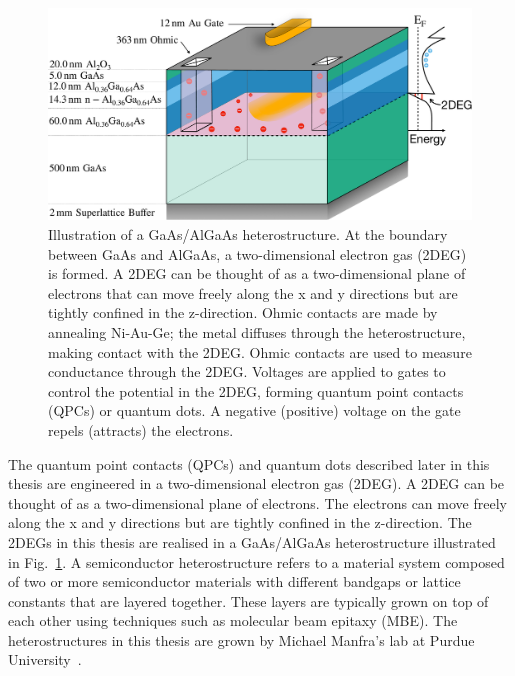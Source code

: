 \begin{figure}[!htb]
 \begin{center}
 \includegraphics[width=1.0\textwidth]{figures/ch1/figure2.pdf}
 \caption[GaAs/AlGaAs Heterostructure]{\label{fig:ch1/2Deg} 
 Illustration of a GaAs/AlGaAs heterostructure. At the boundary between GaAs and AlGaAs, a two-dimensional electron gas (2DEG) is formed. A 2DEG can be thought of as a two-dimensional plane of electrons that can move freely along the x and y directions but are tightly confined in the z-direction. Ohmic contacts are made by annealing Ni-Au-Ge; the metal diffuses through the heterostructure, making contact with the 2DEG. Ohmic contacts are used to measure conductance through the 2DEG. Voltages are applied to gates to control the potential in the 2DEG, forming quantum point contacts (QPCs) or quantum dots. A negative (positive) voltage on the gate repels (attracts) the electrons.
 }
 \end{center}
\end{figure}



The quantum point contacts (QPCs) and quantum dots described later in this thesis are engineered in a two-dimensional electron gas (2DEG). A 2DEG can be thought of as a two-dimensional plane of electrons. The electrons can move freely along the x and y directions but are tightly confined in the z-direction. The 2DEGs in this thesis are realised in a GaAs/AlGaAs heterostructure illustrated in Fig.~\ref{fig:ch1/2Deg}. A semiconductor heterostructure refers to a material system composed of two or more semiconductor materials with different bandgaps or lattice constants that are layered together. These layers are typically grown on top of each other using techniques such as molecular beam epitaxy (MBE). The heterostructures in this thesis are grown by Michael Manfra's lab at Purdue University~\cite{manfra_high_quality}. 

